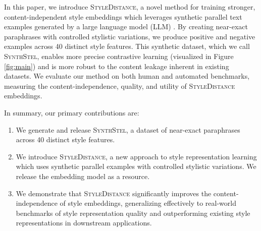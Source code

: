 In this paper, we introduce \textsc{StyleDistance}, a novel method for training stronger, content-independent style embeddings which leverages synthetic parallel text examples generated by a large language model (LLM) \citep{gpt4}. By creating near-exact paraphrases with controlled stylistic variations, we produce positive and negative examples across 40 distinct style features. This synthetic dataset, which we call \textsc{SynthStel}, enables more precise contrastive learning (visualized in Figure \ref{fig:main}) and is more robust to the content leakage inherent in existing datasets. We evaluate our method on both human and automated benchmarks, measuring the content-independence, quality, and utility of \textsc{StyleDistance} embeddings.

In summary, our primary contributions are:

\begin{enumerate}
\item We generate and release \textsc{SynthStel}, a dataset of near-exact paraphrases across 40 distinct style features.

\item We introduce \textsc{StyleDistance}, a new approach to style representation learning which uses synthetic parallel examples with controlled stylistic variations. We release the embedding model as a resource.

\item We demonstrate that \textsc{StyleDistance} significantly improves the content-independence of style embeddings, generalizing effectively to real-world benchmarks of style representation quality and outperforming existing style representations in downstream applications.
\end{enumerate}